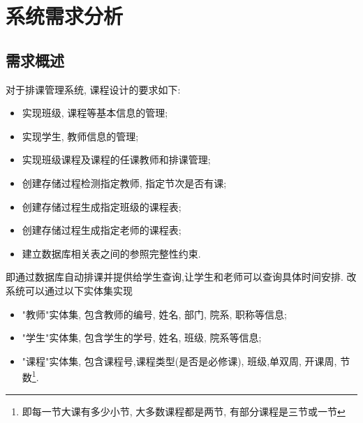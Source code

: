 \documentclass{myreport}
\begin{document}
\maketitle

\newpage
\tableofcontents
\newpage

\section{系统需求分析}
  \subsection{需求概述}
    对于排课管理系统, 课程设计的要求如下:
    \begin{itemize}
      \item 实现班级, 课程等基本信息的管理;
      \item 实现学生, 教师信息的管理;
      \item 实现班级课程及课程的任课教师和排课管理;
      \item 创建存储过程检测指定教师, 指定节次是否有课;
      \item 创建存储过程生成指定班级的课程表;
      \item 创建存储过程生成指定老师的课程表;
      \item 建立数据库相关表之间的参照完整性约束.
    \end{itemize}

    即通过数据库自动排课并提供给学生查询,让学生和老师可以查询具体时间安排.
    改系统可以通过以下实体集实现
    \begin{itemize}
      \item "教师"实体集, 包含教师的编号, 姓名, 部门, 院系, 职称等信息;
      \item "学生"实体集, 包含学生的学号, 姓名, 班级, 院系等信息;
      \item "课程"实体集, 包含课程号,课程类型(是否是必修课), 班级,单双周, 开课周, 节数\footnote{即每一节大课有多少小节, 大多数课程都是两节, 有部分课程是三节或一节}.
    \end{itemize}


\nocite{silberschatz1997database} %
\nocite{sqldbm} %
\end{document}
